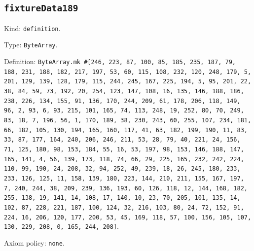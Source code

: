 \documentclass[11pt]{article}
\begin{document}
\subsection*{\texttt{fixtureData189}}
\noindent Kind: \texttt{definition}.\par
\noindent Type: \texttt{ByteArray}.\par
\noindent Definition: \texttt{ByteArray.mk \#[246, 223, 87, 100, 85, 185, 235, 187, 79, 188, 231, 188, 182, 217, 197, 53, 60, 115, 108, 232, 120, 248, 179, 5, 201, 129, 139, 128, 179, 115, 244, 245, 167, 225, 194, 5, 95, 201, 22, 38, 84, 59, 73, 192, 20, 254, 123, 147, 108, 16, 135, 146, 188, 186, 238, 226, 134, 155, 91, 136, 170, 244, 209, 61, 178, 206, 118, 149, 96, 2, 93, 6, 93, 215, 101, 165, 74, 113, 248, 19, 252, 80, 70, 249, 83, 18, 7, 196, 56, 1, 170, 189, 38, 230, 243, 60, 255, 107, 234, 181, 66, 182, 105, 130, 194, 165, 160, 117, 41, 63, 182, 199, 190, 11, 83, 33, 87, 177, 164, 240, 206, 246, 211, 53, 28, 79, 40, 221, 24, 156, 71, 125, 180, 98, 153, 184, 55, 16, 53, 197, 98, 153, 146, 188, 147, 165, 141, 4, 56, 139, 173, 118, 74, 66, 29, 225, 165, 232, 242, 224, 110, 99, 190, 24, 208, 32, 94, 252, 49, 239, 18, 26, 245, 180, 233, 233, 126, 125, 11, 158, 139, 180, 223, 144, 210, 211, 155, 167, 197, 7, 240, 244, 38, 209, 239, 136, 193, 60, 126, 118, 12, 144, 168, 182, 255, 138, 19, 141, 14, 108, 17, 140, 10, 23, 70, 205, 101, 135, 14, 102, 87, 228, 221, 187, 100, 124, 32, 216, 103, 80, 24, 72, 152, 91, 224, 16, 206, 120, 177, 200, 53, 45, 169, 118, 57, 100, 156, 105, 107, 130, 229, 208, 0, 165, 244, 208]}.\par
\noindent Axiom policy: \texttt{none}.\par
\end{document}
